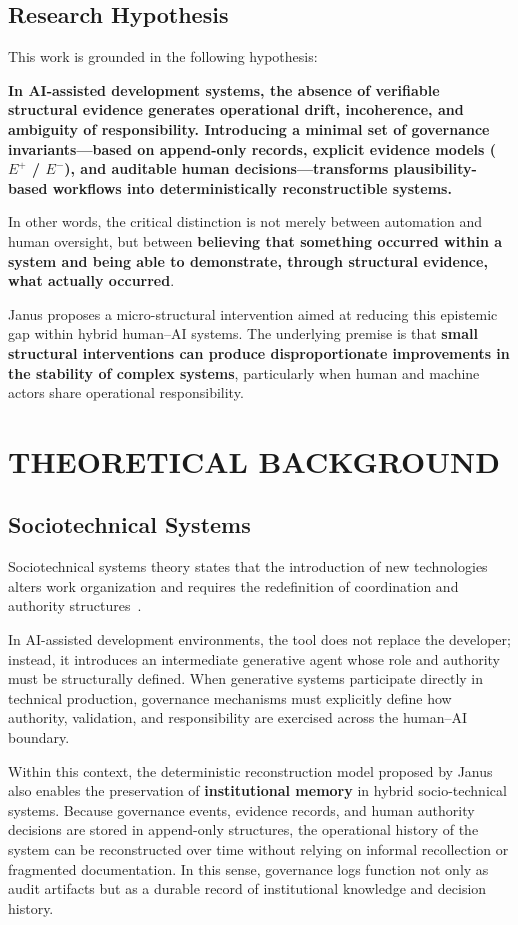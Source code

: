 \documentclass[conference]{IEEEtran}
\begin{document}
\subsection{Research Hypothesis}
This work is grounded in the following hypothesis:

\textbf{In AI-assisted development systems, the absence of verifiable structural evidence generates operational drift, incoherence, and ambiguity of responsibility. Introducing a minimal set of governance invariants---based on append-only records, explicit evidence models ($E^{+}$ / $E^{-}$), and auditable human decisions---transforms plausibility-based workflows into deterministically reconstructible systems.}

In other words, the critical distinction is not merely between automation and human oversight, but between \textbf{believing that something occurred within a system and being able to demonstrate, through structural evidence, what actually occurred}.

Janus proposes a micro-structural intervention aimed at reducing this epistemic gap within hybrid human--AI systems. The underlying premise is that \textbf{small structural interventions can produce disproportionate improvements in the stability of complex systems}, particularly when human and machine actors share operational responsibility.

\section{THEORETICAL BACKGROUND}
\subsection{Sociotechnical Systems}
Sociotechnical systems theory states that the introduction of new technologies alters work organization and requires the redefinition of coordination and authority structures~\cite{trist1951}.

In AI-assisted development environments, the tool does not replace the developer; instead, it introduces an intermediate generative agent whose role and authority must be structurally defined. When generative systems participate directly in technical production, governance mechanisms must explicitly define how authority, validation, and responsibility are exercised across the human--AI boundary.

Within this context, the deterministic reconstruction model proposed by Janus also enables the preservation of \textbf{institutional memory} in hybrid socio-technical systems. Because governance events, evidence records, and human authority decisions are stored in append-only structures, the operational history of the system can be reconstructed over time without relying on informal recollection or fragmented documentation. In this sense, governance logs function not only as audit artifacts but as a durable record of institutional knowledge and decision history.
\end{document}
